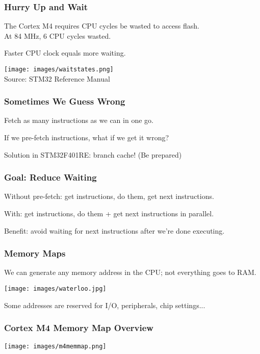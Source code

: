 \begin{frame}
\frametitle{Hurry Up and Wait}

The Cortex M4 requires CPU cycles be wasted to access flash.\\
\quad At 84 MHz, 6 CPU cycles wasted.

Faster CPU clock equals more waiting.

\begin{center}
  \texttt{[image: images/waitstates.png]}\\
  \hfill Source: STM32 Reference Manual
\end{center}

\end{frame}

\begin{frame}
\frametitle{Sometimes We Guess Wrong}

Fetch as many instructions as we can in one go.

If we pre-fetch instructions, what if we get it wrong?

Solution in STM32F401RE: branch cache! (Be prepared)

\end{frame}

\begin{frame}
\frametitle{Goal: Reduce Waiting}

Without pre-fetch: get instructions, do them, get next instructions.

With: get instructions, do them + get next instructions in parallel.

Benefit: avoid waiting for next instructions after we're done executing.

\end{frame}

\begin{frame}
\frametitle{Memory Maps}

We can generate any memory address in the CPU; not everything goes to RAM.

\begin{center}
  \texttt{[image: images/waterloo.jpg]}
\end{center}

Some addresses are reserved for I/O, peripherals, chip settings...

\end{frame}

\begin{frame}
\frametitle{Cortex M4 Memory Map Overview}

\begin{center}
  \texttt{[image: images/m4memmap.png]}
\end{center}

\end{frame}

